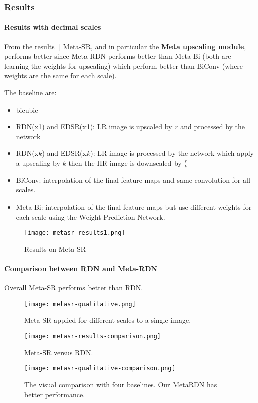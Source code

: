 \subsubsection{Results}

\paragraph{Results with decimal scales}
From the results [] Meta-SR, and in particular the \textbf{Meta upscaling module}, performs better since Meta-RDN performs better than Meta-Bi (both are learning the weights for upscaling) which perform better than BiConv (where weights are the same for each scale).

The baseline are:
\begin{itemize}
    \item bicubic
    \item RDN(x1) and EDSR(x1): LR image is upscaled by $r$ and processed by the network
    \item RDN(x$k$) and EDSR(x$k$): LR image is processed by the network which apply a upscaling by $k$ then the HR image is downscaled by $\frac{r}{k}$
    \item BiConv: interpolation of the final feature maps and same convolution for all scales.
    \item Meta-Bi: interpolation of the final feature maps but use different weights for each scale using the Weight Prediction Network. 
\end{itemize}
\begin{figure}[H]
    \centering
    \texttt{[image: metasr-results1.png]}
    \caption{Results on Meta-SR}\label{metasr:results}
\end{figure}

\paragraph{Comparison between RDN and Meta-RDN}
Overall Meta-SR performs better than RDN.
\begin{figure}[H]
    \centering
    \texttt{[image: metasr-qualitative.png]}
    \caption{Meta-SR applied for different scales to a single image.}
\end{figure}
\begin{figure}[H]
    \centering
    \texttt{[image: metasr-results-comparison.png]}
    \caption{Meta-SR versus RDN.}
\end{figure}
\begin{figure}[H]
    \centering
    \texttt{[image: metasr-qualitative-comparison.png]}
    \caption{The visual comparison with four baselines. Our MetaRDN has better performance.}
\end{figure}
